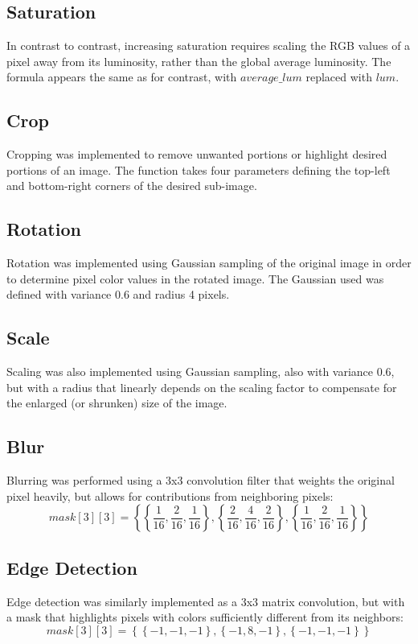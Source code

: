 \documentclass[10pt,twocolumn,twoside]{IEEEtran}
\begin{document}
\subsection{Saturation}
In contrast to contrast, increasing saturation requires scaling the RGB values of a pixel away from its luminosity, rather than the global average luminosity. The formula appears the same as for contrast, with $average\_lum$ replaced with $lum$.

\subsection{Crop}
Cropping was implemented to remove unwanted portions or highlight desired portions of an image. The function takes four parameters defining the top-left and bottom-right corners of the desired sub-image.

\subsection{Rotation}
Rotation was implemented using Gaussian sampling of the original image in order to determine pixel color values in the rotated image. The Gaussian used was defined with variance 0.6 and radius 4 pixels.

\subsection{Scale}
Scaling was also implemented using Gaussian sampling, also with variance 0.6, but with a radius that linearly depends on the scaling factor to compensate for the enlarged (or shrunken) size of the image.

\subsection{Blur}
Blurring was performed using a 3x3 convolution filter that weights the original pixel heavily, but allows for contributions from neighboring pixels:
\begin{equation*}
mask[3][3] = \left\{ \left\{\frac{1}{16}, \frac{2}{16}, \frac{1}{16}\right\}, \left\{\frac{2}{16}, \frac{4}{16}, \frac{2}{16}\right\}, \left\{\frac{1}{16}, \frac{2}{16}, \frac{1}{16}\right\} \right\}
\end{equation*}

\subsection{Edge Detection}
Edge detection was similarly implemented as a 3x3 matrix convolution, but with a mask that highlights pixels with colors sufficiently different from its neighbors:
\begin{equation*}
mask[3][3] = \left\{ \left\{-1, -1, -1\right\}, \left\{-1, 8, -1\right\}, \left\{-1, -1, -1\right\} \right\}
\end{equation*}
\end{document}
